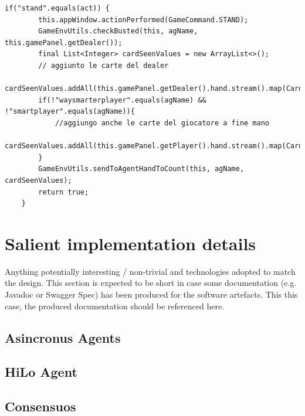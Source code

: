 \begin{lstlisting}[style=java, caption=Java implementation of different behaviour based on specifc agent, label=lst:java_stand_action]
    if("stand".equals(act)) {
        this.appWindow.actionPerformed(GameCommand.STAND);
        GameEnvUtils.checkBusted(this, agName, this.gamePanel.getDealer());
        final List<Integer> cardSeenValues = new ArrayList<>();
        // aggiunto le carte del dealer
        cardSeenValues.addAll(this.gamePanel.getDealer().hand.stream().map(Card::getValue).collect(Collectors.toList()));
        if(!"waysmarterplayer".equals(agName) && !"smartplayer".equals(agName)){
            //aggiungo anche le carte del giocatore a fine mano
            cardSeenValues.addAll(this.gamePanel.getPlayer().hand.stream().map(Card::getValue).collect(Collectors.toList()));
        }
        GameEnvUtils.sendToAgentHandToCount(this, agName, cardSeenValues);
        return true;
    }
\end{lstlisting}


\chapter{Salient implementation details}
Anything potentially interesting / non-trivial and technologies adopted to match the
design. This section is expected to be short in case some documentation (e.g. Javadoc
or Swagger Spec) has been produced for the software artefacts. This this case, the
produced documentation should be referenced here.

\section{Asincronus Agents}

\section{HiLo Agent}

\section{Consensuos}


